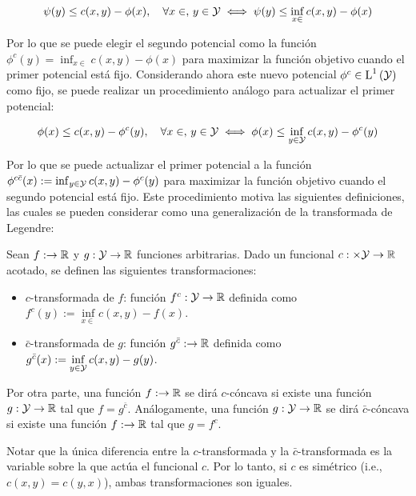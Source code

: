 \begin{equation*}
	\psi(y) \leq c(x,y) - \phi(x), \quad \forall x\in,\,y\in\mathcal{Y}
	\iff
	\psi(y) \leq \inf_{x\in} c(x,y) - \phi(x)
\end{equation*}

Por lo que se puede elegir el segundo potencial como la función $\phi^c(y) = \inf_{x\in\xspace} c(x,y) - \phi(x)$ para maximizar la función objetivo cuando el primer potencial está fijo. Considerando ahora este nuevo potencial $\phi^c\in \operatorname{L}^{1}\left(\mathcal{Y}\right)$ como fijo, se puede realizar un procedimiento análogo para actualizar el primer potencial:

\begin{equation*}
	\phi(x) \leq c(x,y) - \phi^c(y), \quad \forall x\in,\,y\in\mathcal{Y}
	\iff
	\phi(x) \leq \inf_{y\in\mathcal{Y}} c(x,y) - \phi^c(y)
\end{equation*}

Por lo que se puede actualizar el primer potencial a la función $\phi^{c\bar c}(x) := \inf_{y\in\mathcal{Y}} c(x,y) - \phi^c(y)$ para maximizar la función objetivo cuando el segundo potencial está fijo. Este procedimiento motiva las siguientes definiciones, las cuales se pueden considerar como una generalización de la transformada de Legendre:

\begin{defn}
	\label{defn:c_transform}
	Sean $f:\to\mathbb{R}$ y $g:\mathcal{Y}\to \mathbb{R}$ funciones arbitrarias. Dado un funcional $c:\times\mathcal{Y}\to\mathbb{R}$ acotado, se definen las siguientes transformaciones:

	\begin{itemize}
		\item $c$-transformada  de $f$: función $f^c:\mathcal{Y}\to\mathbb{R}$ definida como $f^c(y) := \inf\limits_{x\in\xspace} c(x,y) - f(x)$.

		\item $\bar c$-transformada  de $g$: función $g^{\bar c}:\to\mathbb{R}$ definida como $g^{\bar c}(x) := \inf\limits_{y\in\mathcal{Y}} c(x,y) - g(y)$.
	\end{itemize}

	Por otra parte, una función $f:\to\mathbb{R}$ se dirá $c$-cóncava si existe una función $g:\mathcal{Y}\to\mathbb{R}$ tal que $f=g^{\bar c}$. Análogamente, una función $g:\mathcal{Y}\to\mathbb{R}$ se dirá $\bar c$-cóncava si existe una función $f:\to\mathbb{R}$ tal que $g=f^c$.
\end{defn}

Notar que la única diferencia entre la $c$-transformada y la $\bar c$-transformada es la variable sobre la que actúa el funcional $c$. Por lo tanto, si $c$ es simétrico (i.e., $c(x,y)=c(y,x)$), ambas transformaciones son iguales.

